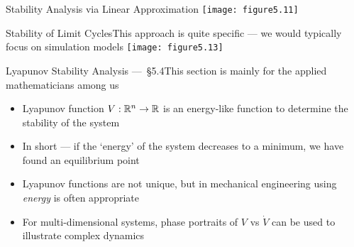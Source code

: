 \documentclass{beamer-control}
\begin{document}
\begin{frame}{Stability Analysis via Linear Approximation}
\texttt{[image: figure5.11]}
\end{frame}



\begin{frame}{Stability of Limit Cycles}{This approach is quite specific --- we would typically focus on simulation models}
\texttt{[image: figure5.13]}

\end{frame}


\begin{frame}{Lyapunov Stability Analysis — §5.4}{This section is mainly for the applied mathematicians among us}
\begin{itemize}
\item Lyapunov function $V : \mathbb{R}^n \to \mathbb{R}$ is an energy-like function to determine the stability of the system
\item In short --- if the `energy' of the system decreases to a minimum, we have found an equilibrium point
\item Lyapunov functions are not unique, but in mechanical engineering using \emph{energy} is often appropriate
\item For multi-dimensional systems, phase portraits of $V$ vs $\dot V$ can be used to illustrate complex dynamics 
\end{itemize} 
\end{frame}

\SUMMARYFRAME
\FINALE
\end{document}
